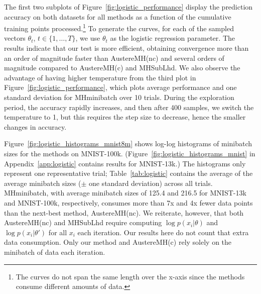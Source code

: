 \documentclass[letterpaper]{article}
\begin{document}
The first two subplots of Figure~\ref{fig:logistic_performance} display the
prediction accuracy on both datasets for all methods as a function of the
cumulative training points processed.\footnote{The curves do not span the same
length over the x-axis since the methods consume different amounts of data.} To
generate the curves, for each of the sampled vectors $\theta_t$,
$t\in\{1,\ldots,T\}$, we use $\theta_t$ as the logistic regression parameter.
The results indicate that our test is more efficient, obtaining convergence more
than an order of magnitude faster than {\sc AustereMH(nc)} and several orders of
magnitude compared to {\sc AustereMH(c)} and {\sc MHSubLhd}.  We also observe
the advantage of having higher temperature from the third plot in
Figure~\ref{fig:logistic_performance}, which plots average performance and one
standard deviation for {\sc MHminibatch} over 10 trials. During the exploration
period, the accuracy rapidly increases, and then after 400 samples, we switch
the temperature to 1, but this requires the step size to decrease, hence the
smaller changes in accuracy.

Figure~\ref{fig:logistic_histograms_mnist8m} shows log-log histograms of
minibatch sizes for the methods on MNIST-100k.
(Figure~\ref{fig:logistic_histograms_mnist} in Appendix~\ref{app:logistic}
contains results for MNIST-13k.) The histograms only represent one
representative trial; Table~\ref{tab:logistic} contains the average of the
average minibatch sizes ($\pm$ one standard deviation) across all trials. {\sc
MHminibatch}, with average minibatch sizes of 125.4 and 216.5 for MNIST-13k and
MNIST-100k, respectively, consumes more than 7x and 4x fewer data points than
the next-best method, {\sc AustereMH(nc)}.  We reiterate, however, that both
{\sc AustereMH(nc)} and {\sc MHSubLhd} require computing $\log p(x_i|\theta)$
and $\log p(x_i|\theta')$ for all $x_i$ each iteration. Our results here do not
count that extra data consumption. Only our method and {\sc AustereMH(c)} rely
solely on the minibatch of data each iteration.
\end{document}
